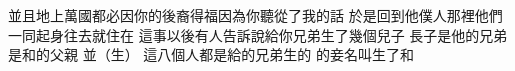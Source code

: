 並且地上萬國都必因你的後裔得福\chientien 因為你聽從了我的話\yuentien 
{}於是回到他僕人那裡\chientien 他們一同起身往去\chientien{}就住在\chuan\Chuan
{}這事以後\chientien 有人告訴說\chientien{}給你兄弟生了幾個兒子\chientien 
{}長子是\chientien 他的兄弟是\chientien 和的父親\yuentien 
{}並\chientien{}\chientien{}\chientien{}\chientien{}\chientien （生）
這八個人\chientien 都是給的兄弟生的\chuan 
{}的\hss\linebreak 妾名叫\chientien 生了\chientien{}\chientien{}\chientien 和\chuan 
